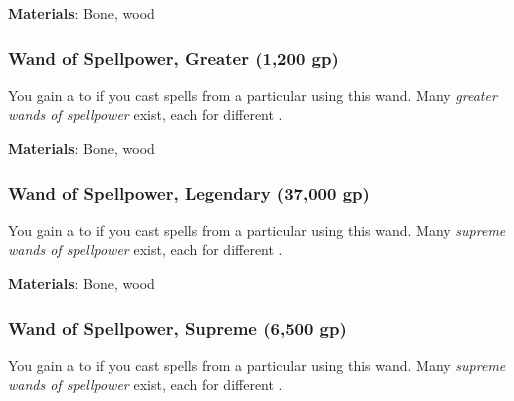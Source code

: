 \textbf{Materials}: Bone, wood


\lowercase{\hypertarget{item:Wand of Spellpower, Greater}{}}\label{item:Wand of Spellpower, Greater}
\hypertarget{item:Wand of Spellpower, Greater}{\subsubsection{Wand of Spellpower, Greater\hfill{} (1,200 gp)}}

You gain a   to  if you cast spells from a particular  using this wand.
Many \textit{greater wands of spellpower} exist, each for different .



\textbf{Materials}: Bone, wood


\lowercase{\hypertarget{item:Wand of Spellpower, Legendary}{}}\label{item:Wand of Spellpower, Legendary}
\hypertarget{item:Wand of Spellpower, Legendary}{\subsubsection{Wand of Spellpower, Legendary\hfill{} (37,000 gp)}}

You gain a   to  if you cast spells from a particular  using this wand.
Many \textit{supreme wands of spellpower} exist, each for different .



\textbf{Materials}: Bone, wood


\lowercase{\hypertarget{item:Wand of Spellpower, Supreme}{}}\label{item:Wand of Spellpower, Supreme}
\hypertarget{item:Wand of Spellpower, Supreme}{\subsubsection{Wand of Spellpower, Supreme\hfill{} (6,500 gp)}}

You gain a   to  if you cast spells from a particular  using this wand.
Many \textit{supreme wands of spellpower} exist, each for different .




